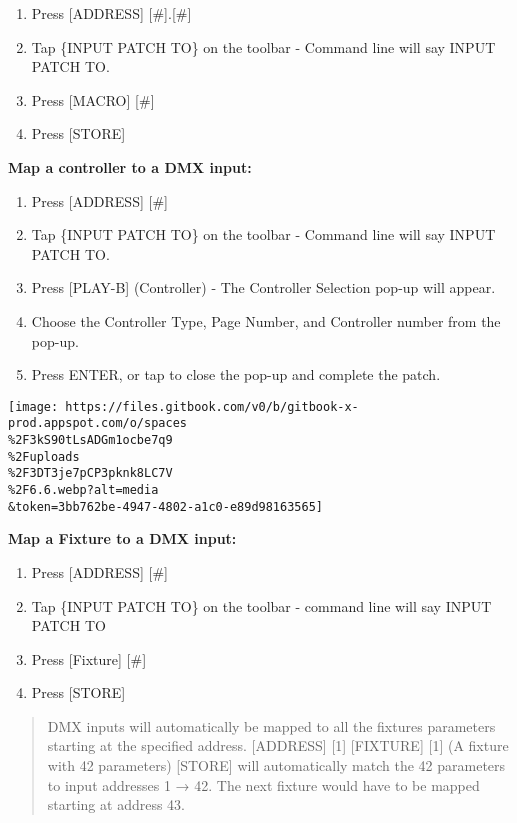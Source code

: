 \documentclass[
]{article}
\begin{document}
\begin{enumerate}
\def\labelenumi{\arabic{enumi}.}
\item
  Press {[}ADDRESS{]} {[}\#{]}.{[}\#{]}
\item
  Tap \{INPUT PATCH TO\} on the toolbar - Command line will say INPUT PATCH TO.
\item
  Press {[}MACRO{]} {[}\#{]}
\item
  Press {[}STORE{]}
\end{enumerate}

\textbf{Map a controller to a DMX input:}

\begin{enumerate}
\def\labelenumi{\arabic{enumi}.}
\item
  Press {[}ADDRESS{]} {[}\#{]}
\item
  Tap \{INPUT PATCH TO\} on the toolbar - Command line will say INPUT PATCH TO.
\item
  Press {[}PLAY-B{]} (Controller) - The Controller Selection pop-up will appear.
\item
  Choose the Controller Type, Page Number, and Controller number from the pop-up.
\item
  Press ENTER, or tap \href{image.png}{} to close the pop-up and complete the patch.
\end{enumerate}

\texttt{[image: https://files.gitbook.com/v0/b/gitbook-x-prod.appspot.com/o/spaces\\\%2F3kS90tLsADGm1ocbe7q9\\\%2Fuploads\\\%2F3DT3je7pCP3pknk8LC7V\\\%2F6.6.webp?alt=media\\\&token=3bb762be-4947-4802-a1c0-e89d98163565]}

\textbf{Map a Fixture to a DMX input:}

\begin{enumerate}
\def\labelenumi{\arabic{enumi}.}
\item
  Press {[}ADDRESS{]} {[}\#{]}
\item
  Tap \{INPUT PATCH TO\} on the toolbar - command line will say INPUT PATCH TO
\item
  Press {[}Fixture{]} {[}\#{]}
\item
  Press {[}STORE{]}
\end{enumerate}

\begin{quote}
DMX inputs will automatically be mapped to all the fixtures parameters starting at the specified address. {[}ADDRESS{]} {[}1{]} {[}FIXTURE{]} {[}1{]} (A fixture with 42 parameters) {[}STORE{]} will automatically match the 42 parameters to input addresses 1 → 42. The next fixture would have to be mapped starting at address 43.
\end{quote}
\end{document}
